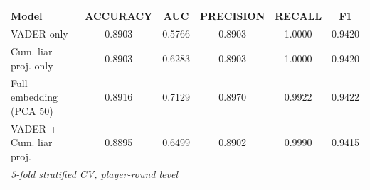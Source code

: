 \begingroup
\centering
\begin{tabular}{lccccc}
   \tabularnewline \midrule \midrule
   Model & ACCURACY & AUC & PRECISION & RECALL & F1 \\
   \midrule
   VADER only & 0.8903 & 0.5766 & 0.8903 & 1.0000 & 0.9420 \\
   Cum. liar proj. only & 0.8903 & 0.6283 & 0.8903 & 1.0000 & 0.9420 \\
   Full embedding (PCA 50) & 0.8916 & 0.7129 & 0.8970 & 0.9922 & 0.9422 \\
   VADER + Cum. liar proj. & 0.8895 & 0.6499 & 0.8902 & 0.9990 & 0.9415 \\
   \midrule \midrule
   \multicolumn{6}{l}{\emph{5-fold stratified CV, player-round level}}\\
\end{tabular}
\par\endgroup
